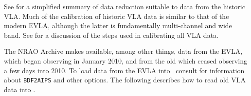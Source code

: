 See  for a simplified summary of data reduction suitable
to data from the historic VLA\@.  Much of the calibration of historic
VLA data is similar to that of the modern EVLA, although the latter is
fundamentally multi-channel and wide band.  See  for a
discussion of the steps used in calibrating all VLA data.


     The NRAO Archive makes available, among other things, data from
the EVLA, which began observing in January 2010, and from the old
 which ceased observing a few days into 2010.  To load data
from the EVLA into \AIPS\ consult  for information about
{\tt BDF2AIPS} and other options.  The following describes how to read
old VLA data into \AIPS\@.

